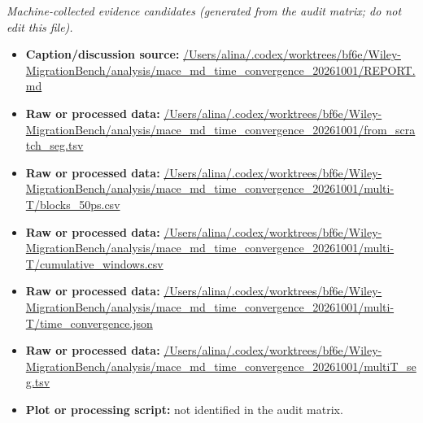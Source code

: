 \emph{Machine-collected evidence candidates (generated from the audit matrix; do not edit this file).}
\begin{itemize}[leftmargin=1.4em,noitemsep]
\item \textbf{Caption/discussion source:} \url{/Users/alina/.codex/worktrees/bf6e/Wiley-MigrationBench/analysis/mace_md_time_convergence_20261001/REPORT.md}
\item \textbf{Raw or processed data:} \url{/Users/alina/.codex/worktrees/bf6e/Wiley-MigrationBench/analysis/mace_md_time_convergence_20261001/from_scratch_seg.tsv}
\item \textbf{Raw or processed data:} \url{/Users/alina/.codex/worktrees/bf6e/Wiley-MigrationBench/analysis/mace_md_time_convergence_20261001/multi-T/blocks_50ps.csv}
\item \textbf{Raw or processed data:} \url{/Users/alina/.codex/worktrees/bf6e/Wiley-MigrationBench/analysis/mace_md_time_convergence_20261001/multi-T/cumulative_windows.csv}
\item \textbf{Raw or processed data:} \url{/Users/alina/.codex/worktrees/bf6e/Wiley-MigrationBench/analysis/mace_md_time_convergence_20261001/multi-T/time_convergence.json}
\item \textbf{Raw or processed data:} \url{/Users/alina/.codex/worktrees/bf6e/Wiley-MigrationBench/analysis/mace_md_time_convergence_20261001/multiT_seg.tsv}
\item \textbf{Plot or processing script:} not identified in the audit matrix.
\end{itemize}
